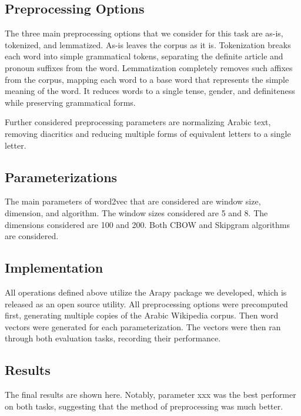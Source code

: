 \subsection{Preprocessing Options}

The three main preprocessing options that we consider for this task are as-is, tokenized, and lemmatized. As-is leaves the corpus as it is. Tokenization breaks each word into simple grammatical tokens, separating the definite article and pronoun suffixes from the word. Lemmatization completely removes such affixes from the corpus, mapping each word to a base word that represents the simple meaning of the word. It reduces words to a single tense, gender, and definiteness while preserving grammatical forms.

Further considered preprocessing parameters are normalizing Arabic text, removing diacritics and reducing multiple forms of equivalent letters to a single letter.

\subsection{Parameterizations}

The main parameters of word2vec that are considered are window size, dimension, and algorithm. The window sizes considered are 5 and 8. The dimensions considered are 100 and 200. Both CBOW and Skipgram algorithms are considered.

\subsection{Implementation}

All operations defined above utilize the Arapy package we developed, which is released as an open source utility. All preprocessing options were precomputed first, generating multiple copies of the Arabic Wikipedia corpus. Then word vectors were generated for each parameterization. The vectors were then ran through both evaluation tasks, recording their performance.

\subsection{Results}

The final results are shown here. Notably, parameter xxx was the best performer on both tasks, suggesting that the method of preprocessing was much better.

\label{sec:experiments}
